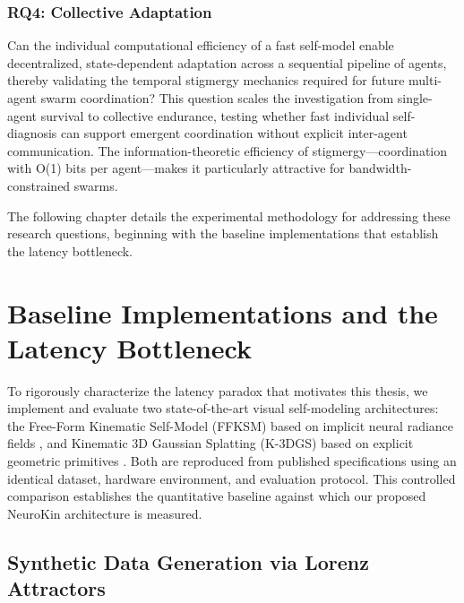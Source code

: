 \documentclass[12pt,a4paper,oneside]{report}
\begin{document}
\subsection{RQ4: Collective Adaptation}
\label{subsec:rq4_collective_adaptation}

Can the individual computational efficiency of a fast self-model enable decentralized, state-dependent adaptation across a sequential pipeline of agents, thereby validating the temporal stigmergy mechanics required for future multi-agent swarm coordination? This question scales the investigation from single-agent survival to collective endurance, testing whether fast individual self-diagnosis can support emergent coordination without explicit inter-agent communication. The information-theoretic efficiency of stigmergy—coordination with O(1) bits per agent—makes it particularly attractive for bandwidth-constrained swarms.

The following chapter details the experimental methodology for addressing these research questions, beginning with the baseline implementations that establish the latency bottleneck.








\chapter{Baseline Implementations and the Latency Bottleneck}
\label{chap:baseline_latency_bottleneck}

To rigorously characterize the latency paradox that motivates this thesis, we implement and evaluate two state-of-the-art visual self-modeling architectures: the Free-Form Kinematic Self-Model (FFKSM) based on implicit neural radiance fields \cite{hu2024teaching}, and Kinematic 3D Gaussian Splatting (K-3DGS) based on explicit geometric primitives \cite{hu2025learning}. Both are reproduced from published specifications using an identical dataset, hardware environment, and evaluation protocol. This controlled comparison establishes the quantitative baseline against which our proposed NeuroKin architecture is measured.

\section{Synthetic Data Generation via Lorenz Attractors}
\end{document}

